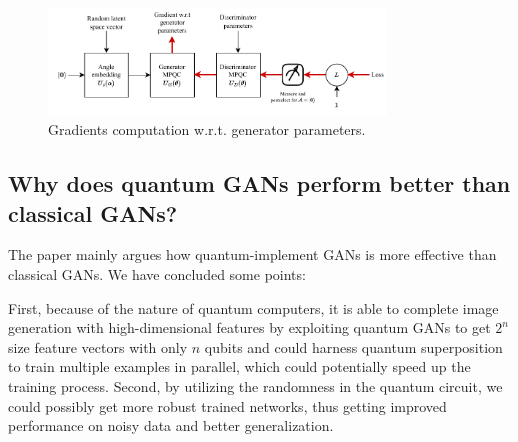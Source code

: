 \begin{figure}[H]
    \centering
    \includegraphics[width=0.8\textwidth]{figures/gen_fake.pdf}
    \caption{Gradients computation w.r.t. generator parameters.}
    \label{fig:bar_data}
\end{figure}


\subsection{Why does quantum GANs perform better than classical GANs?}
The paper mainly argues how quantum-implement GANs is more effective than classical GANs. We have concluded some points: 

First, because of the nature of quantum computers, it is able to complete image generation with high-dimensional features by exploiting quantum GANs to get $2^n$ size feature vectors with only $n$ qubits and could harness quantum superposition to train multiple examples in parallel, which could potentially speed up the training process. Second, by utilizing the randomness in the quantum circuit, we could possibly get more robust trained networks, thus getting improved performance on noisy data and better generalization. 




